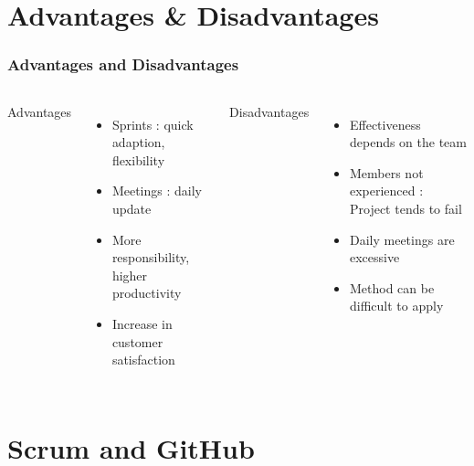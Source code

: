 \documentclass{beamer}
\begin{document}
\section{Advantages \& Disadvantages}

\begin{frame}
    \frametitle{Advantages and Disadvantages}
    
    \begin{columns}
    
    Advantages
    \begin{itemize} 
    \item<2-> Sprints : quick adaption, flexibility
    \item<3-> Meetings : daily update
    \item<4-> More responsibility, higher productivity
    \item<5-> Increase in customer satisfaction
    \end{itemize}
    
    Disadvantages
    \begin{itemize}
    \item<6-> Effectiveness depends on the team
    \item<7-> Members not experienced : Project tends to fail
    \item<8-> Daily meetings are excessive
    \item<9-> Method can be difficult to apply
    \end{itemize}
    \end{columns}
\end{frame}



\section{Scrum and GitHub}
\end{document}
